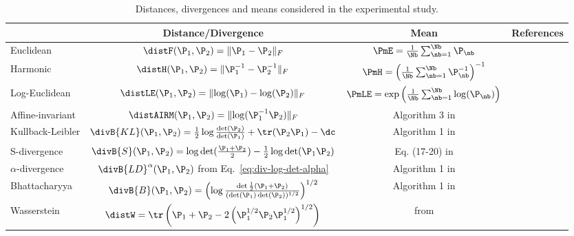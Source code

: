 \begin{table}[h]
  \centering
  \begin{tabular}{ l | c | c | c |}
    \cline{2-4}
    & Distance/Divergence & Mean & References \rule[-5pt]{0pt}{18pt} \\ \hline
    \multicolumn{1}{|l|}{Euclidean} & $\distF(\P_1, \P_2) = \lVert \P_1-\P_2 \rVert _F$ & $\PmE = \frac{1}{\Nb}\sum_{\nb=1}^{\Nb} \P_\nb$ & \rule[-5pt]{0pt}{18pt} \\  
    \multicolumn{1}{|l|}{Harmonic} & $\distH(\P_1, \P_2) = \lVert \P_1^{-1}-\P_2^{-1} \rVert _F$ & $\PmH = \left(   \frac{1}{\Nb}\sum_{\nb=1}^{\Nb} \P_\nb^{-1} \right)^{-1} $ & \cite{lim_matrix_2012} \rule[-5pt]{0pt}{18pt} \\ 
		 \multicolumn{1}{|l|}{Log-Euclidean} & $\distLE(\P_1, \P_2) = \lVert \log(\P_1)-\log(\P_2) \rVert_F$ & $\PmLE = \exp \left( \frac{1}{\Nb} \sum_{\nb=1}^{\Nb} \log(\P_\nb) \right) $ & \cite{arsigny_geometric_2007} 
		\rule[-5pt]{0pt}{18pt} \\    
     \multicolumn{1}{|l|}{Affine-invariant} & $\distAIRM(\P_1, \P_2) = \lVert \log(\P_1^{-1}\P_2) \rVert_F$ & Algorithm 3 in \cite{fletcher_principal_2004}  & \cite{moakher_differential_2005,fletcher_principal_2004} 
		\rule[-5pt]{0pt}{18pt} \\	
	\multicolumn{1}{|l|}{Kullback-Leibler} & $\divB{KL}(\P_1, \P_2) = \frac{1}{2} \log \frac{\det(\P_2)}{\det(\P_1)} + \tr(\P_2 \P_1) - \dc$ & Algorithm 1 in \cite{chebbi_means_2012} & \cite{chebbi_means_2012,kang_composite_2009} \rule[-5pt]{0pt}{18pt} \\
	\multicolumn{1}{|l|}{S-divergence} & $\divB{S}(\P_1,\P_2) = \log \det(\frac{\P_1+\P_2}{2}) - \frac{1}{2}\log \det(\P_1 \P_2)$ &  Eq. (17-20) in \cite{cherian_efficient_2011} & \cite{sra_positive_2016,cherian_efficient_2011} \rule[-5pt]{0pt}{18pt} \\
    \multicolumn{1}{|l|}{$\alpha$-divergence} & $\divB{LD}^\alpha (\P_1, \P_2)$ from Eq.~\eqref{eq:div-log-det-alpha} & Algorithm 1 in \cite{chebbi_means_2012} & \cite{chebbi_means_2012} \rule[-5pt]{0pt}{18pt} \\ 
    \multicolumn{1}{|l|}{Bhattacharyya} & $\divB{B}(\P_1, \P_2)=\left( \log \frac{ \det \frac{1}{2} (\P_1+\P_2)}{(\det (\P_1)\det(\P_2))^{1/2}} \right)^{1/2}$ & Algorithm 1 in \cite{chebbi_means_2012} & \cite{nielsen_matrix_2012,chebbi_means_2012} \rule[-5pt]{0pt}{18pt} \\ 
    \multicolumn{1}{|l|}{Wasserstein} & $\distW = \tr \left( \P_1 + \P_2 - 2 \left( \P_1^{1/2} \P_2 \P_1^{1/2} \right)^{1/2} \right)$ & from \cite{barbaresco_geometric_2011} & \cite{barbaresco_geometric_2011} \rule[-5pt]{0pt}{18pt} \\ \hline
  \end{tabular}
  \caption{Distances, divergences and means considered in the experimental study.}
  \label{tab:dist}
\end{table}
